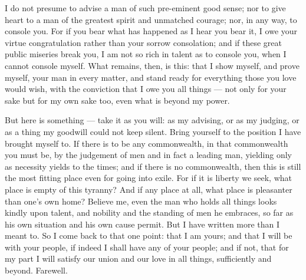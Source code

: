 

 I do not presume to advise a man of such pre-eminent good sense; nor to give heart to a man of the greatest spirit and unmatched courage; nor, in any way, to console you. For if you bear what has happened as I hear you bear it, I owe your virtue congratulation rather than your sorrow consolation; and if these great public miseries break you, I am not so rich in talent as to console you, when I cannot console myself. What remains, then, is this: that I show myself, and prove myself, your man in every matter, and stand ready for everything those you love would wish, with the conviction that I owe you all things --- not only for your sake but for my own sake too, even what is beyond my power.

 But here is something --- take it as you will: as my advising, or as my judging, or as a thing my goodwill could not keep silent. Bring yourself to the position I have brought myself to. If there is to be any commonwealth, in that commonwealth you must be, by the judgement of men and in fact a leading man, yielding only as necessity yields to the times; and if there is no commonwealth, then this is still the most fitting place even for going into exile. For if it is liberty we seek, what place is empty of this tyranny? And if any place at all, what place is pleasanter than one's own home? Believe me, even the man who holds all things looks kindly upon talent, and nobility and the standing of men he embraces, so far as his own situation and his own cause permit. But I have written more than I meant to. So I come back to that one point: that I am yours; and that I will be with your people, if indeed I shall have any of your people; and if not, that for my part I will satisfy our union and our love in all things, sufficiently and beyond. Farewell.
